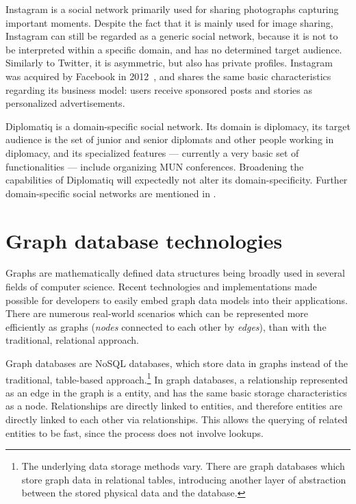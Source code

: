 Instagram is a social network primarily used for sharing photographs capturing important moments. Despite the fact that it is mainly used for image sharing, Instagram can still be regarded as a generic social network, because it is not to be interpreted within a specific domain, and has no determined target audience. Similarly to Twitter, it is asymmetric, but also has private profiles. Instagram was acquired by Facebook in 2012~\cite{facebookacquiresinstagram}, and shares the same basic characteristics regarding its business model: users receive sponsored posts and stories as personalized advertisements.

Diplomatiq is a domain-specific social network. Its domain is diplomacy, its target audience is the set of junior and senior diplomats and other people working in diplomacy, and its specialized features — currently a very basic set of functionalities — include organizing MUN conferences. Broadening the capabilities of Diplomatiq will expectedly not alter its domain-specificity. Further domain-specific social networks are mentioned in .

\section{Graph database technologies}

Graphs are mathematically defined data structures being broadly used in several fields of computer science. Recent technologies and implementations made possible for developers to easily embed graph data models into their applications. There are numerous real-world scenarios which can be represented more efficiently as graphs (\emph{nodes} connected to each other by \emph{edges}), than with the traditional, relational approach.

Graph databases are NoSQL databases, which store data in graphs instead of the traditional, table-based approach.\footnote{The underlying data storage methods vary. There are graph databases which store graph data in relational tables, introducing another layer of abstraction between the stored physical data and the database.} In graph databases, a relationship represented as an edge in the graph is a  entity, and has the same basic storage characteristics as a node. Relationships are directly linked to entities, and therefore entities are directly linked to each other via relationships. This allows the querying of related entities to be fast, since the process does not involve lookups.

